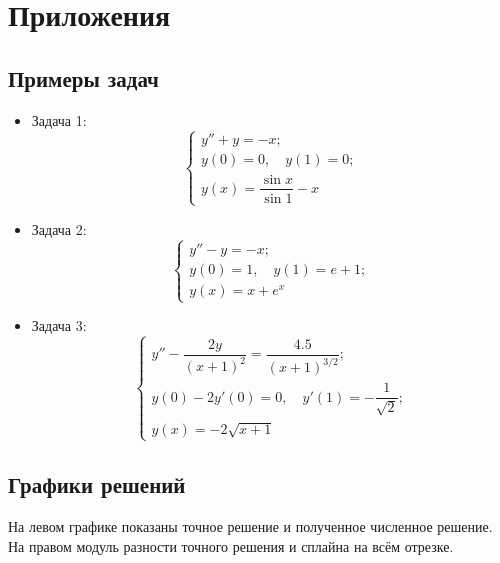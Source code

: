 \section{Приложения}

\subsection{Примеры задач} \label{examples}

\begin{itemize}
    \item Задача 1:
    \[
    \begin{cases}
        y'' + y = -x; \\
        y(0) = 0, \quad y(1) = 0; \\
        y(x) = \dfrac{\sin x}{\sin 1} - x
    \end{cases}
    \]\label{z1}

    \item Задача 2:
    \[
    \begin{cases}
        y'' - y = -x; \\
        y(0) = 1, \quad y(1) = e + 1; \\
        y(x) = x + e^x
    \end{cases}
    \]\label{z2}
    
    \item Задача 3:
    \[
    \begin{cases}
        y'' - \dfrac{2y}{(x+1)^2} = \dfrac{4.5}{(x+1)^{3/2}}; \\
        y(0) - 2y'(0) = 0, \quad y'(1) = -\dfrac{1}{\sqrt{2}}; \\
        y(x) = -2\sqrt{x+1}
    \end{cases}
    \]\label{z3}
\end{itemize}

\subsection{Графики решений} \label{plots}
На левом графике показаны точное решение и полученное численное решение. На правом модуль разности точного решения и сплайна на всём отрезке.

